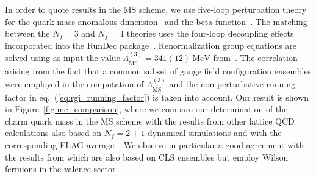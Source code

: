 In order to quote results in the $\overline{\textrm{MS}}$ scheme, we use five-loop perturbation theory for the quark
mass anomalous dimension~\cite{Baikov:2014qja,Luthe:2016xec,Baikov:2017ujl} and the beta function~\cite{Baikov:2016tgj,Herzog:2017ohr,Luthe:2017ttc}.
The matching between the $N_f=3$ and $N_f=4$ theories uses the four-loop decoupling effects~\cite{Liu:2015fxa}
incorporated into the RunDec package~\cite{Chetyrkin:2000yt,Schmidt:2012az,Herren:2017osy}. Renormalization group equations are solved using as input the value 
$\Lambda^{(3)}_{\overline{\mathrm{MS}}} = 341(12)\ \mathrm{MeV}$ from~\cite{Bruno:2017gxd}. The correlation arising from the fact that a common subset of gauge field configuration ensembles were employed in the computation of $\Lambda^{(3)}_{\overline{\mathrm{MS}}}$ and the non-perturbative running factor in eq.~(\ref{eq:rgi_running_factor}) is taken into account. Our result is shown in Figure~\ref{fig:mc_comparison}, where we compare our determination of the charm quark mass in the $\overline{\textrm{MS}}$ scheme with the results from other lattice QCD calculations also based on $N_f=2+1$ dynamical simulations and with the corresponding FLAG average~\cite{FlavourLatticeAveragingGroupFLAG:2021npn}. We observe in particular a good agreement with the results from \cite{Heitger:2021apz} which are also based on CLS ensembles but employ Wilson fermions in the valence sector.


